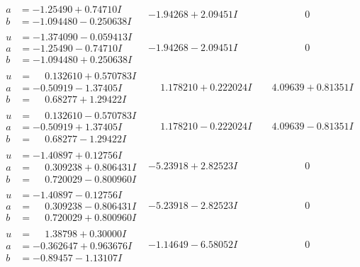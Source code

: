 \documentclass[1p]{elsarticle_modified}
\theoremstyle{definition}
\begin{document}
$$\begin{array}{c|c|c}
\begin{aligned}
a &= -1.25490 + 0.74710 I \\
b &= -1.094480 - 0.250638 I\end{aligned}
 & -1.94268 + 2.09451 I & \phantom{-0.000000 } 0 \\ \hline\begin{aligned}
u &= -1.374090 - 0.059413 I \\
a &= -1.25490 - 0.74710 I \\
b &= -1.094480 + 0.250638 I\end{aligned}
 & -1.94268 - 2.09451 I & \phantom{-0.000000 } 0 \\ \hline\begin{aligned}
u &= \phantom{-}0.132610 + 0.570783 I \\
a &= -0.50919 - 1.37405 I \\
b &= \phantom{-}0.68277 + 1.29422 I\end{aligned}
 & \phantom{-}1.178210 + 0.222024 I & \phantom{-}4.09639 + 0.81351 I \\ \hline\begin{aligned}
u &= \phantom{-}0.132610 - 0.570783 I \\
a &= -0.50919 + 1.37405 I \\
b &= \phantom{-}0.68277 - 1.29422 I\end{aligned}
 & \phantom{-}1.178210 - 0.222024 I & \phantom{-}4.09639 - 0.81351 I \\ \hline\begin{aligned}
u &= -1.40897 + 0.12756 I \\
a &= \phantom{-}0.309238 + 0.806431 I \\
b &= \phantom{-}0.720029 - 0.800960 I\end{aligned}
 & -5.23918 + 2.82523 I & \phantom{-0.000000 } 0 \\ \hline\begin{aligned}
u &= -1.40897 - 0.12756 I \\
a &= \phantom{-}0.309238 - 0.806431 I \\
b &= \phantom{-}0.720029 + 0.800960 I\end{aligned}
 & -5.23918 - 2.82523 I & \phantom{-0.000000 } 0 \\ \hline\begin{aligned}
u &= \phantom{-}1.38798 + 0.30000 I \\
a &= -0.362647 + 0.963676 I \\
b &= -0.89457 - 1.13107 I\end{aligned}
 & -1.14649 - 6.58052 I & \phantom{-0.000000 } 0\\

\end{array}$$
\end{document}
